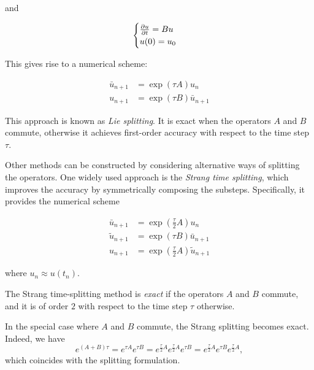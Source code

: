and

\[
    \begin{cases}
        \frac{\partial u}{\partial t} = B u \\
        u(0) = u_0
    \end{cases} 
\]

This gives rise to a numerical scheme:

\[
    \begin{aligned}
        \bar{u}_{n+1} &= \exp(\tau A)u_n \\
        u_{n+1} &= \exp(\tau B)\bar{u}_{n+1}
    \end{aligned}
\]

This approach is known as \emph{Lie splitting}. It is exact when the operators $A$ and $B$ commute, otherwise it achieves first-order accuracy with respect to the time step $\tau$.

Other methods can be constructed by considering alternative ways of splitting the operators. One widely used approach is the \emph{Strang time splitting}, which improves the accuracy by symmetrically composing the substeps. Specifically, it provides the numerical scheme

\begin{equation}
    \begin{aligned}
        \bar{u}_{n+1} &= \exp\left(\frac\tau2 A\right)u_n \\
        \tilde{u}_{n+1} &= \exp(\tau B)\bar{u}_{n+1} \\
        u_{n+1} &= \exp\left(\frac\tau2 A\right)\tilde{u}_{n+1}
    \end{aligned}
\end{equation}

where $u_n \approx u(t_n)$.

\begin{proposition}
    The Strang time-splitting method is \emph{exact} if the operators $A$ and $B$ commute, and it is of order $2$ with respect to the time step $\tau$ otherwise.
\end{proposition}

\begin{remark}
    In the special case where $A$ and $B$ commute, the Strang splitting becomes exact. Indeed, we have
    \[
        e^{(A+B)\tau} = e^{\tau A} e^{\tau B} 
        = e^{\frac{\tau}{2} A} e^{\frac{\tau}{2} A} e^{\tau B} 
        = e^{\frac{\tau}{2} A} e^{\tau B} e^{\frac{\tau}{2} A},
    \]
    which coincides with the splitting formulation.
\end{remark}

